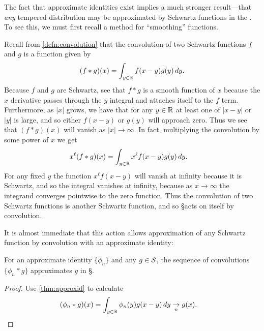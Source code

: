     The fact that approximate identities exist implies a much stronger result---that \emph{any} tempered distribution may be approximated by Schwartz functions in the \ws.
    To see this, we must first recall a method for ``smoothing'' functions.

    Recall from \cref{defn:convolution} that the convolution of two Schwartz functions $f$ and $g$ is a function given by
    \begin{align*}
      (f*g)(x) = \int_{y\in\R} f(x-y)g(y)\,dy \text{.}
    \end{align*}
    Because $f$ and $g$ are Schwartz, see that $f*g$ is a smooth function of $x$ because the $x$ derivative passes through the $y$ integral and attaches itself to the $f$ term.
    Furthermore, as $|x|$ grows, we have that for any $y\in\R$ at least one of $|x-y|$ or $|y|$ is large, and so either $f(x-y)$ or $g(y)$ will approach zero.
    Thus we see that $(f*g)(x)$ will vanish as $|x|\rightarrow\infty$.
    In fact, multiplying the convolution by some power of $x$ we get
    \begin{align*}
      x^\ell(f*g)(x)
      &= \int_{y\in\R} x^\ell f(x-y)g(y)\,dy \text{.}
    \end{align*}
    For any fixed $y$ the function $x^\ell f(x-y)$ will vanish at infinity because it is Schwartz, and so the integral vanishes at infinity, because as $x\rightarrow\infty$ the integrand converges pointwise to the zero function.
    Thus the convolution of two Schwartz functions is another Schwartz function, and so \S acts on itself by convolution.

    It is almost immediate that this action allows approximation of any Schwartz function by convolution with an approximate identity:
    \begin{lemma}
      \label{lemma:approxbyconv}
      For an approximate identity $\{\phi_n\}$ and any $g\in\S$, the sequence of convolutions $\{\phi_n*g\}$ approximates $g$ in \S.
    \end{lemma}
    \begin{proof}
      Use \cref{thm:approxid} to calculate
      \begin{align*}
        (\phi_n*g)(x)
        &= \int_{y\in\R} \phi_n(y)g(x-y)\,dy
        \underset{n}{\rightarrow} g(x) \text{.}
      \end{align*}
    \end{proof}

